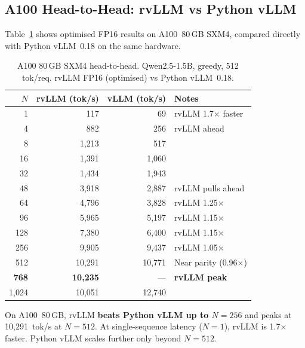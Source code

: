 \documentclass[11pt,a4paper]{article}
\newcommand{\thead}[1]{\textbf{\color{white}#1}}
\begin{document}
\subsection{A100 Head-to-Head: rvLLM vs Python vLLM}

Table~\ref{tab:a100} shows optimised FP16 results on A100~80\,GB SXM4, compared
directly with Python vLLM~0.18 on the same hardware.

\begin{table}[t]
  \centering
  \caption{A100 80\,GB SXM4 head-to-head. Qwen2.5-1.5B, greedy, 512 tok/req. rvLLM FP16 (optimised) vs Python vLLM~0.18.}
  \label{tab:a100}
  \small
  \begin{tabular}{@{}rrrp{3.5cm}@{}}
    \toprule
    \rowcolor{HeaderBlue} \thead{$N$} & \thead{rvLLM (tok/s)} & \thead{vLLM (tok/s)} & \thead{Notes} \\
    \midrule
    1    & 117    & 69     & rvLLM 1.7$\times$ faster \\
    \rowcolor{gray!8}
    4    & 882    & 256    & rvLLM ahead \\
    8    & 1{,}213 & 517   & \\
    \rowcolor{gray!8}
    16   & 1{,}391 & 1{,}060 & \\
    32   & 1{,}434 & 1{,}943 & \\
    \rowcolor{gray!8}
    48   & 3{,}918 & 2{,}887 & rvLLM pulls ahead \\
    64   & 4{,}796 & 3{,}828 & rvLLM 1.25$\times$ \\
    \rowcolor{gray!8}
    96   & 5{,}965 & 5{,}197 & rvLLM 1.15$\times$ \\
    128  & 7{,}380 & 6{,}400 & rvLLM 1.15$\times$ \\
    \rowcolor{gray!8}
    256  & 9{,}905 & 9{,}437 & rvLLM 1.05$\times$ \\
    512  & 10{,}291 & 10{,}771 & Near parity (0.96$\times$) \\
    \rowcolor{gray!8}
    \textbf{768} & \textbf{10{,}235} & --- & \textbf{rvLLM peak} \\
    1{,}024 & 10{,}051 & 12{,}740 & \\
    \bottomrule
  \end{tabular}
\end{table}

On A100~80\,GB, rvLLM \textbf{beats Python vLLM up to $N\!=\!256$} and peaks at
10{,}291~tok/s at $N\!=\!512$. At single-sequence latency ($N\!=\!1$), rvLLM is
1.7$\times$ faster. Python vLLM scales further only beyond $N\!=\!512$.
\end{document}
